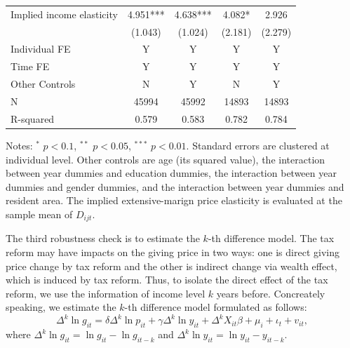\documentclass[ review  , 3p ]{elsarticle}
\begin{document}
\begin{table}
\begin{threeparttable}
\begin{tabular}[t]{lcccc}
  \hspace{1em}Implied income elasticity & 4.951*** & 4.638*** & 4.082* & 2.926\\
  \hspace{1em} & (1.043) & (1.024) & (2.181) & (2.279)\\
  \hspace{1em}Individual FE & Y & Y & Y & Y\\
  \hspace{1em}Time FE & Y & Y & Y & Y\\
  \hspace{1em}Other Controls & N & Y & N & Y\\
  \hspace{1em}N & 45994 & 45992 & 14893 & 14893\\
  \hspace{1em}R-squared & 0.579 & 0.583 & 0.782 & 0.784\\
  \bottomrule
  \end{tabular}
  \begin{tablenotes}
  \item Notes: $^{*}$ $p < 0.1$, $^{**}$ $p < 0.05$, $^{***}$ $p < 0.01$. Standard errors are clustered at individual level. Other controls are age (its squared value), the interaction between year dummies and education dummies, the interaction between year dummies and gender dummies, and the interaction between year dummies and resident area. The implied extensive-marign price elasticity is evaluated at the sample mean of $D_{ijt}$.
  \end{tablenotes}
  \end{threeparttable}
  \end{table}

  The third robustness check is to estimate the \(k\)-th difference model. The tax reform may have impacts on the giving price in two ways: one is direct giving price change by tax reform and the other is indirect change via wealth effect, which is induced by tax reform. Thus, to isolate the direct effect of the tax reform, we use the information of income level \(k\) years before.
  Concreately speaking, we estimate the \(k\)-th difference model formulated as follows:
  \[
  \Delta^k \ln g_{it} = \delta \Delta^k \ln p_{it} + \gamma \Delta^k \ln y_{it} + \Delta^k X_{it} \beta + \mu_i + \iota_t + v_{it},
  \]
  where \(\Delta^k \ln g_{it} = \ln g_{it} - \ln g_{it-k}\) and \(\Delta^k \ln y_{it} = \ln y_{it} - y_{it-k}\).
\end{document}
